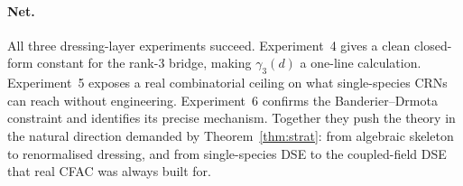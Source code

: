 \documentclass[11pt,a4paper]{article}
\theoremstyle{plain}
\theoremstyle{definition}
\begin{document}
\paragraph{Net.}
All three dressing-layer experiments succeed.  Experiment~4
gives a clean closed-form constant for the rank-$3$ bridge,
making $\gamma_{3}(d)$ a one-line calculation.  Experiment~5
exposes a real combinatorial ceiling on what single-species
CRNs can reach without engineering.  Experiment~6 confirms the
Banderier--Drmota constraint and identifies its precise
mechanism.  Together they push the theory in the natural
direction demanded by Theorem~\ref{thm:strat}: from algebraic
skeleton to renormalised dressing, and from single-species DSE
to the coupled-field DSE that real CFAC was always built for.

\end{document}
